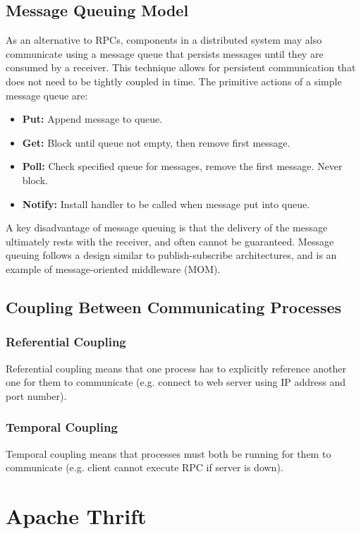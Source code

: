 \documentclass[12pt,titlepage]{article}
\begin{document}
    \subsection{Message Queuing Model} 
      As an alternative to RPCs, components in a distributed system may also communicate using a message queue that persists messages until they are consumed
      by a receiver. This technique allows for persistent communication that does not need to be tightly coupled in time. The primitive actions of a simple
      message queue are:
      \begin{itemize}
        \item \textbf{Put:} Append message to queue.
        \item \textbf{Get:} Block until queue not empty, then remove first message.
        \item \textbf{Poll:} Check specified queue for messages, remove the first message. Never block.
        \item \textbf{Notify:} Install handler to be called when message put into queue.
      \end{itemize}

      A key disadvantage of message queuing is that the delivery of the message ultimately rests with the receiver, and often cannot be guaranteed. Message
      queuing follows a design similar to publish-subscribe architectures, and is an example of message-oriented middleware (MOM).

    \subsection{Coupling Between Communicating Processes}
      \subsubsection{Referential Coupling}
        Referential coupling means that one process has to explicitly reference another one for them to communicate (e.g. connect to web server using IP
        address and port number).
      \subsubsection{Temporal Coupling}
        Temporal coupling means that processes must both be running for them to communicate (e.g. client cannot execute RPC if server is down).

  \section{Apache Thrift}
\end{document}
